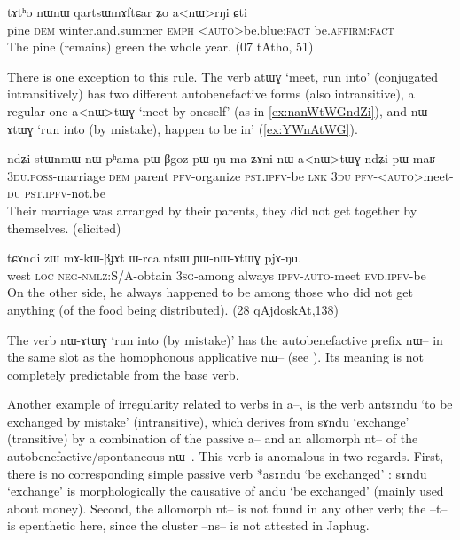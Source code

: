 \documentclass[oldfontcommands,oneside,a4paper,11pt]{article}
\newcommand{\ipa}[1]{{\phon \mbox{#1}}} %
\begin{document}
\begin{exe}
\ex \label{ex:anWrŋi}
\gll 
\ipa{tɤtʰo}  	\ipa{nɯnɯ}  	\ipa{qartsɯmɤftɕar}  	\ipa{ʑo}  	\ipa{a<nɯ>rŋi}  	\ipa{ɕti}  \\
pine \textsc{dem} winter.and.summer \textsc{emph} <\textsc{auto}>be.blue:\textsc{fact} be.\textsc{affirm:fact} \\
\glt The pine (remains) green the whole year. (07 tAtho, 51)
\end{exe}
 
 
 There is one exception to this rule. The verb \ipa{atɯɣ} `meet, run into' (conjugated intransitively) has two different autobenefactive forms (also intransitive), a regular one \ipa{a<nɯ>tɯɣ} `meet by oneself' (as in \ref{ex:nanWtWGndZi}), and  \ipa{nɯ-ɤtɯɣ}  `run into (by mistake), happen to be in'   (\ref{ex:YWnAtWG}).
 
 \begin{exe}
\ex \label{ex:nanWtWGndZi}
\gll 
\ipa{ndʑi-stɯnmɯ}  	\ipa{nɯ}  	\ipa{pʰama}  	\ipa{pɯ-βgoz}  	\ipa{pɯ-ŋu}  	\ipa{ma}  	\ipa{ʑɤni}  	\ipa{nɯ-a<nɯ>tɯɣ-ndʑi}  	\ipa{pɯ-maʁ}  \\
\textsc{3du.poss}-marriage \textsc{dem} parent \textsc{pfv}-organize \textsc{pst.ipfv}-be \textsc{lnk} \textsc{3du} \textsc{pfv}-<\textsc{auto}>meet-\textsc{du}  \textsc{pst.ipfv}-not.be \\
\glt Their marriage was arranged by their parents, they did not get together by themselves. (elicited)
\end{exe}

 \begin{exe}
\ex \label{ex:YWnAtWG}
\gll 
\ipa{tɕɤndi}  	\ipa{zɯ}  	\ipa{mɤ-kɯ-βɟɤt}  	\ipa{ɯ-rca}  	\ipa{ntsɯ}  	\ipa{ɲɯ-nɯ-ɤtɯɣ}  	\ipa{pjɤ-ŋu.}  \\
west \textsc{loc} \textsc{neg-nmlz}:S/A-obtain \textsc{3sg}-among always \textsc{ipfv-auto}-meet \textsc{evd.ipfv}-be \\
\glt On the other side, he always happened to be among those who did not get anything (of the food being distributed). (28 qAjdoskAt,138)
\end{exe}

The verb \ipa{nɯ-ɤtɯɣ}  `run into (by mistake)'  has the autobenefactive prefix \ipa{nɯ--} in the same slot as the homophonous applicative \ipa{nɯ--} (see \citealt{jacques13tropative}). Its meaning   is not completely predictable from the base verb.

Another example of irregularity related to verbs in \ipa{a--}, is the verb \ipa{antsɤndu} `to be exchanged by mistake' (intransitive), which derives from   \ipa{sɤndu} `exchange' (transitive) by a combination of the passive \ipa{a--} and an allomorph \ipa{nt--} of the autobenefactive/spontaneous \ipa{nɯ--}. This verb is anomalous in two regards. First, there is no corresponding simple passive verb *\ipa{asɤndu} `be exchanged' : \ipa{sɤndu} `exchange' is morphologically the causative of \ipa{andu} `be exchanged' (mainly used about money). Second, the allomorph \ipa{nt--} is not found in any other verb; the \ipa{--t--} is epenthetic here, since the cluster \ipa{--ns--} is not attested in Japhug.
\end{document}
